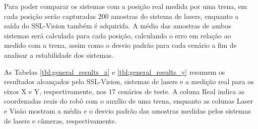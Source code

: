 \documentclass[acronym, symbols, table]{fei}
\begin{document}
				Para poder comparar os sistemas com a posição real medida por uma trena, em cada posição serão capturadas 200 amostras do sistema de lasers, enquanto a saída do SSL-Vision também é adquirida. A média das amostras de ambos sistemas será calculada para cada posição, calculando o erro em relação ao medido com a trena, assim como o desvio padrão para cada cenário a fim de analisar a estabilidade dos sistemas.
				
				As Tabelas \ref{tbl:general_results_x} e \ref{tbl:general_results_y} resumem os resultados alcançados pelo SSL-Vision, sistemas de lasers e a medição real para os eixos X e Y, respectivamente, nos 17 cenários de teste. A coluna Real indica as coordenadas reais do robô com o auxílio de uma trena, enquanto as colunas Laser e Visão mostram a média e o desvio padrão das amostras medidas pelos sistemas de lasers e câmeras, respectivamente.
				
\end{document}
